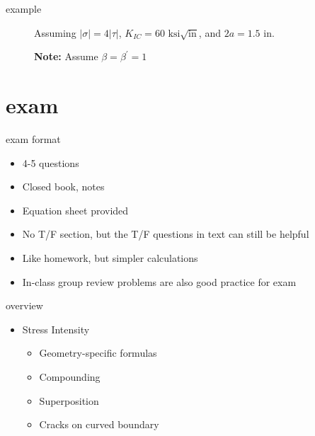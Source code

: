 \documentclass[10pt]{beamer}
\begin{document}
\begin{frame}{example}
	\begin{figure}[H]
		Assuming $|\sigma| = 4|\tau|$, $K_{IC} = 60 \text{ ksi} \sqrt{\text{in}}$, and $2a = 1.5 \text{ in}$.
		
		\textbf{Note:} Assume $\beta = \beta^\prime = 1$
		
		\centering
	\end{figure}
\end{frame}

\section{exam}

\begin{frame}{exam format}
	\begin{itemize}
		\item 4-5 questions
		\item Closed book, notes
		\item Equation sheet provided
		\item No T/F section, but the T/F questions in text can still be helpful
		\item Like homework, but simpler calculations
		\item In-class group review problems are also good practice for exam
	\end{itemize}
\end{frame}

\begin{frame}{overview}
	\begin{itemize}[<+->]
		\item Stress Intensity
		\begin{itemize}[<+->]
			\item Geometry-specific formulas
			\item Compounding
			\item Superposition
			\item Cracks on curved boundary
		\end{itemize}
	\end{itemize}
\end{frame}
\end{document}
